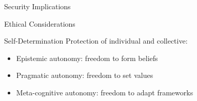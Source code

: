 \documentclass[
  ignorenonframetext,
]{beamer}
\providecommand{\tightlist}{%
  \setlength{\itemsep}{0pt}\setlength{\parskip}{0pt}}
\begin{document}
\begin{frame}{Security Implications}
\begin{block}{Ethical Considerations}
\begin{block}{Self-Determination}
\protect{}\label{self-determination}
Protection of individual and collective:

\begin{itemize}
\tightlist
\item
  Epistemic autonomy: freedom to form beliefs
\item
  Pragmatic autonomy: freedom to set values
\item
  Meta-cognitive autonomy: freedom to adapt frameworks
\end{itemize}
\end{block}
\end{block}
\end{frame}
\end{document}
